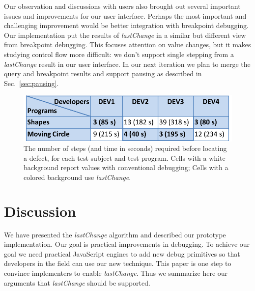 \documentclass{sig-alternate}
\begin{document}
Our observation and discussions with users also brought out several important issues and improvements
for our user interface. Perhaps the most important and challenging improvement would be better integration 
with breakpoint debugging. Our implementation put the results of \textit{lastChange} in a similar but different
view from breakpoint debugging. This focuses attention on value changes, but it makes studying control 
flow more difficult: we don't support single stepping from a \textit{lastChange} result in our user interface. In our next iteration we 
plan to merge the query and breakpoint results and support pausing as described in Sec.~\ref{sec:pausing}.


\begin{figure}[htp]
\centering 
\includegraphics[width=.48\textwidth]{10-userstudy.pdf}
\caption{The number of steps (and time in seconds) required before locating a defect, for each test subject and test program. 
Cells with a white background report values with conventional debugging; Cells with a colored background use \textit{lastChange}.}

\label{fig:userstudy}
\end{figure}

\section{Discussion}

We have presented the \textit{lastChange} algorithm and described our
prototype implementation. Our goal is practical improvements in debugging. To achieve our goal we need practical JavaScript engines
to add new debug primitives so that developers in the field can use our new technique. This paper is
one step to convince implementers to enable \textit{lastChange}.
Thus we summarize here our arguments that \textit{lastChange} should be supported.

\end{document}
